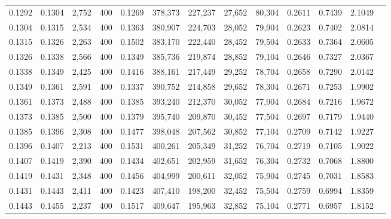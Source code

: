 \begin{tabular}{rrrrrrrrrrrrr}
0.1292 & 0.1304 &  2,752 & 400 &                                     0.1269 & 378,373 & 227,237 &  27,652 &  80,304 & 0.2611 & 0.7439 & 2.1049 \\
0.1304 & 0.1315 &  2,534 & 400 &                                     0.1363 & 380,907 & 224,703 &  28,052 &  79,904 & 0.2623 & 0.7402 & 2.0814 \\
0.1315 & 0.1326 &  2,263 & 400 &                                     0.1502 & 383,170 & 222,440 &  28,452 &  79,504 & 0.2633 & 0.7364 & 2.0605 \\
0.1326 & 0.1338 &  2,566 & 400 &                                     0.1349 & 385,736 & 219,874 &  28,852 &  79,104 & 0.2646 & 0.7327 & 2.0367 \\
0.1338 & 0.1349 &  2,425 & 400 &                                     0.1416 & 388,161 & 217,449 &  29,252 &  78,704 & 0.2658 & 0.7290 & 2.0142 \\
0.1349 & 0.1361 &  2,591 & 400 &                                     0.1337 & 390,752 & 214,858 &  29,652 &  78,304 & 0.2671 & 0.7253 & 1.9902 \\
0.1361 & 0.1373 &  2,488 & 400 &                                     0.1385 & 393,240 & 212,370 &  30,052 &  77,904 & 0.2684 & 0.7216 & 1.9672 \\
0.1373 & 0.1385 &  2,500 & 400 &                                     0.1379 & 395,740 & 209,870 &  30,452 &  77,504 & 0.2697 & 0.7179 & 1.9440 \\
0.1385 & 0.1396 &  2,308 & 400 &                                     0.1477 & 398,048 & 207,562 &  30,852 &  77,104 & 0.2709 & 0.7142 & 1.9227 \\
0.1396 & 0.1407 &  2,213 & 400 &                                     0.1531 & 400,261 & 205,349 &  31,252 &  76,704 & 0.2719 & 0.7105 & 1.9022 \\
0.1407 & 0.1419 &  2,390 & 400 &                                     0.1434 & 402,651 & 202,959 &  31,652 &  76,304 & 0.2732 & 0.7068 & 1.8800 \\
0.1419 & 0.1431 &  2,348 & 400 &                                     0.1456 & 404,999 & 200,611 &  32,052 &  75,904 & 0.2745 & 0.7031 & 1.8583 \\
0.1431 & 0.1443 &  2,411 & 400 &                                     0.1423 & 407,410 & 198,200 &  32,452 &  75,504 & 0.2759 & 0.6994 & 1.8359 \\
0.1443 & 0.1455 &  2,237 & 400 &                                     0.1517 & 409,647 & 195,963 &  32,852 &  75,104 & 0.2771 & 0.6957 & 1.8152 \\

\end{tabular}
